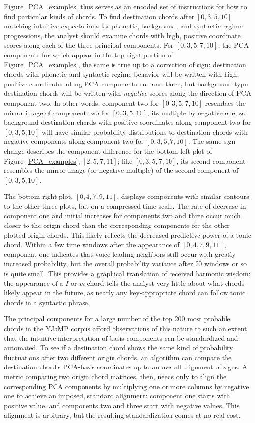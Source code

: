 Figure~\ref{PCA_examples} thus serves as an encoded set of instructions for how to find particular kinds of chords.  To find destination chords after $[0,3,5,10]$ matching intuitive expectations for phonetic, background, and syntactic-regime progressions, the analyst should examine chords with high, positive coordinate scores along each of the three principal components.  For $[0,3,5,7,10]$, the PCA components for which appear in the top right portion of Figure~\ref{PCA_examples}, the same is true up to a correction of sign: destination chords with phonetic and syntactic regime behavior will be written with high, positive coordinates along PCA components one and three, but background-type destination chords will be written with \emph{negative} scores along the direction of PCA component two.  In other words, component two for $[0,3,5,7,10]$ resembles the mirror image of component two for $[0,3,5,10]$, its multiple by negative one, so background destination chords with positive coordinates along component two for $[0,3,5,10]$ will have similar probability distributions to destination chords with negative components along component two for $[0,3,5,7,10]$.  The same sign change describes the component difference for the bottom-left plot of Figure~\ref{PCA_examples}, $[2,5,7,11]$; like $[0,3,5,7,10]$, its second component resembles the mirror image (or negative multiple) of the second component of $[0,3,5,10]$.

The bottom-right plot, $[0,4,7,9,11]$, displays components with similar contours to the other three plots, but on a compressed time-scale.  The rate of decrease in component one and initial increases for components two and three occur much closer to the origin chord than the corresponding components for the other plotted origin chords.  This likely reflects the decreased predictive power of a tonic chord.  Within a few time windows after the appearance of $[0,4,7,9,11]$, component one indicates that voice-leading neighbors still occur with greatly increased probability, but the overall probability variance after 20 windows or so is quite small.  This provides a graphical translation of received harmonic wisdom: the appearance of a $I$ or $vi$ chord tells the analyst very little about what chords likely appear in the future, as nearly any key-appropriate chord can follow tonic chords in a syntactic phrase.

The principal components for a large number of the top 200 most probable chords in the YJaMP corpus afford observations of this nature to such an extent that the intuitive interpretation of basis components can be standardized and automated.  To see if a destination chord shows the same kind of probability fluctuations after two different origin chords, an algorithm can compare the destination chord's PCA-basis coordinates up to an overall alignment of signs.  A metric comparing two origin chord matrices, then, needs only to align the corresponding PCA components by multiplying one or more columns by negative one to achieve an imposed, standard alignment: component one starts with positive value, and components two and three start with negative values.  This alignment is arbitrary, but the resulting standardization comes at no real cost.

